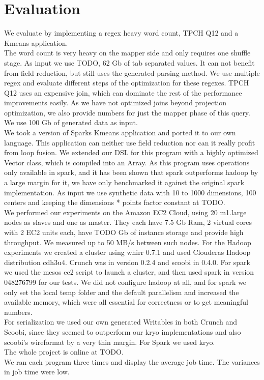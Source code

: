 \section{Evaluation}
\label{sec:evaluation}


We evaluate \tool by implementing a regex heavy word count, TPCH Q12 and a Kmeans application. \\
The word count is very heavy on the mapper side and only requires one shuffle stage. As input we use TODO, 62 Gb of tab separated values. It can not benefit from field reduction, but still uses the generated parsing method. We use multiple regex and evaluate different steps of the optimization for these regexes. TPCH Q12 uses an expensive join, which can dominate the rest of the performance improvements easily. As we have not optimized joins beyond projection optimization, we also provide numbers for just the mapper phase of this query. We use 100 Gb of generated data as input. \\
We took a version of Sparks Kmeans application and ported it to our own language. This application can neither use field reduction nor can it really profit from loop fusion. We extended our DSL for this program with a highly optimized Vector class, which is compiled into an Array. As this program uses operations only available in spark, and it has been shown that spark outperforms hadoop by a large margin for it, we have only benchmarked it against the original spark implementation. As input we use synthetic data with 10 to 1000 dimensions, 100 centers and keeping the dimensions * points factor constant at TODO. \\
We performed our experiments on the Amazon EC2 Cloud, using 20 m1.large nodes as slaves and one as master. They each have 7.5 Gb Ram, 2 virtual cores with 2 EC2 units each, have TODO Gb of instance storage and provide high throughput. We measured up to 50 MB/s between such nodes. For the Hadoop experiments we created a cluster using whirr 0.7.1 and used Clouderas Hadoop distribution cdh3u4. Crunch  was in version 0.2.4 and scoobi in 0.4.0. For spark we used the mesos ec2 script to launch a cluster, and then used spark in version 048276799 for our tests. We did not configure hadoop at all, and for spark we only set the local temp folder and the default parallelism and increased the available memory, which were all essential for correctness or to get meaningful numbers. \\
For serialization we used our own generated Writables in both Crunch and Scoobi, since they seemed to outperform our kryo implementations and also scoobi's wireformat by a very thin margin. For Spark we used kryo. \\
The whole project is online at TODO. \\
We ran each program three times and display the average job time. The variances in job time were low. \\
